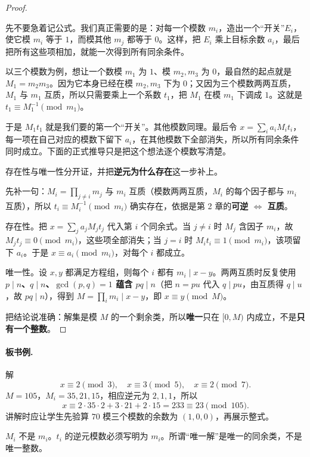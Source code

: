 \begin{proof}
\begin{tip}
先不要急着记公式。我们真正需要的是：对每一个模数 $m_i$，造出一个“开关”$E_i$，使它模 $m_i$ 等于 $1$，而模其他 $m_j$ 都等于 $0$。这样，把 $E_i$ 乘上目标余数 $a_i$，最后把所有这些项相加，就能一次得到所有同余条件。

以三个模数为例，想让一个数模 $m_1$ 为 $1$、模 $m_2,m_3$ 为 $0$，最自然的起点就是 $M_1=m_2m_3$。因为它本身已经在模 $m_2,m_3$ 下为 $0$；又因为三个模数两两互质，$M_1$ 与 $m_1$ 互质，所以只需要乘上一个系数 $t_1$，把 $M_1$ 在模 $m_1$ 下调成 $1$。这就是 $t_1\equiv M_1^{-1}\pmod{m_1}$。

于是 $M_1t_1$ 就是我们要的第一个“开关”。其他模数同理。最后令 $x=\sum_i a_iM_it_i$，每一项在自己对应的模数下留下 $a_i$，在其他模数下全部消失，所以所有同余条件同时成立。下面的正式推导只是把这个想法逐个模数写清楚。
\end{tip}
存在性与唯一性分开证，并把\textbf{逆元为什么存在}这一步补上。

先补一句：$M_i=\prod_{j\ne i}m_j$ 与 $m_i$ 互质（模数两两互质，$M_i$ 的每个因子都与 $m_i$ 互质），所以 $t_i\equiv M_i^{-1}\pmod{m_i}$ 确实存在，依据是第 2 章的\textbf{可逆 $\iff$ 互质}。

存在性。把 $x=\sum_j a_jM_jt_j$ 代入第 $i$ 个同余式。当 $j\ne i$ 时 $M_j$ 含因子 $m_i$，故 $M_jt_j\equiv0\pmod{m_i}$，这些项全部消失；当 $j=i$ 时 $M_it_i\equiv1\pmod{m_i}$，该项留下 $a_i$。于是 $x\equiv a_i\pmod{m_i}$，对每个 $i$ 都成立。

唯一性。设 $x,y$ 都满足方程组，则每个 $i$ 都有 $m_i\mid x-y$。两两互质时反复使用\textbf{$p\mid n$、$q\mid n$、$\gcd(p,q)=1$ 蕴含 $pq\mid n$}（把 $n=pu$ 代入 $q\mid pu$，由互质得 $q\mid u$，故 $pq\mid n$），得到 $M=\prod_i m_i\mid x-y$，即 $x\equiv y\pmod M$。

把结论说准确：解集是模 $M$ 的一个剩余类，所以\textbf{唯一}只在 $[0,M)$ 内成立，不是\textbf{只有一个整数}。
\end{proof}

\paragraph{板书例.} 解
\[
 x\equiv2\pmod3,\quad x\equiv3\pmod5,\quad x\equiv2\pmod7.
\]
$M=105$，$M_i=35,21,15$，相应逆元为 $2,1,1$，所以
\[
 x\equiv2\cdot35\cdot2+3\cdot21+2\cdot15=233\equiv23\pmod{105}.
\]
讲解时应让学生先验算 $70$ 模三个模数的余数为 $(1,0,0)$，再展示整式。
\begin{pitfall}
$M_i$ 不是 $m_i$。$t_i$ 的逆元模数必须写明为 $m_i$。所谓“唯一解”是唯一的同余类，不是唯一整数。
\end{pitfall}


